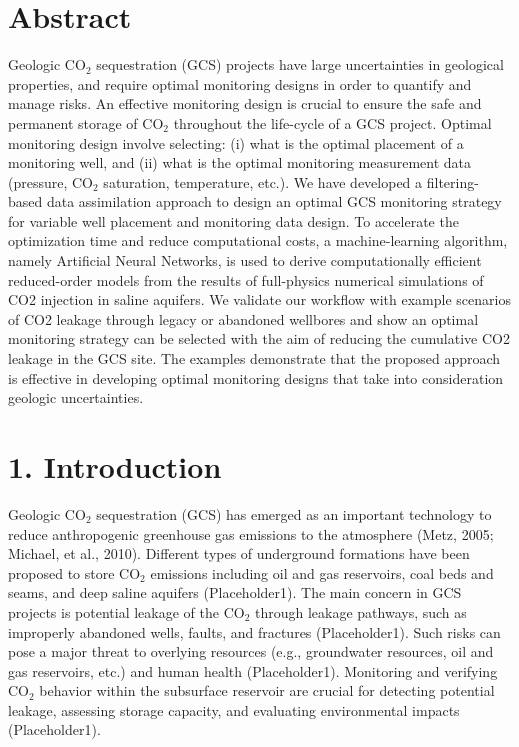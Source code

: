 \documentclass[10pt, twoside]{article}
\begin{document}
\section*{\textbf{Abstract}}
Geologic CO$_2$ sequestration (GCS) projects have large uncertainties in geological properties, and require optimal monitoring designs in order to quantify and manage risks. An effective monitoring design is crucial to ensure the safe and permanent storage of CO$_2$ throughout the life-cycle of a GCS project. Optimal monitoring design involve selecting: (i) what is the optimal placement of a monitoring well, and (ii) what is the optimal monitoring measurement data (pressure, CO$_2$ saturation, temperature, etc.). We have developed a filtering-based data assimilation approach to design an optimal GCS monitoring strategy for variable well placement and monitoring data design. To accelerate the optimization time and reduce computational costs, a machine-learning algorithm, namely Artificial Neural Networks, is used to derive computationally efficient reduced-order models from the results of full-physics numerical simulations of CO2 injection in saline aquifers. We validate our workflow with example scenarios of CO2 leakage through legacy or abandoned wellbores and show an optimal monitoring strategy can be selected with the aim of reducing the cumulative CO2 leakage in the GCS site. The examples demonstrate that the proposed approach is effective in developing optimal monitoring designs that take into consideration geologic uncertainties.

\section*{\textbf{1. Introduction}}
Geologic CO$_2$ sequestration (GCS) has emerged as an important technology to reduce anthropogenic greenhouse gas emissions to the atmosphere (Metz, 2005; Michael, et al., 2010). Different types of underground formations have been proposed to store CO$_2$ emissions including oil and gas reservoirs, coal beds and seams, and deep saline aquifers (Placeholder1). The main concern in GCS projects is potential leakage of the CO$_2$ through leakage pathways, such as improperly abandoned wells, faults, and fractures (Placeholder1). Such risks can pose a major threat to overlying resources (e.g., groundwater resources, oil and gas reservoirs, etc.) and human health (Placeholder1). Monitoring and verifying CO$_2$ behavior within the subsurface reservoir are crucial for detecting potential leakage, assessing storage capacity, and evaluating environmental impacts (Placeholder1).
\end{document}
